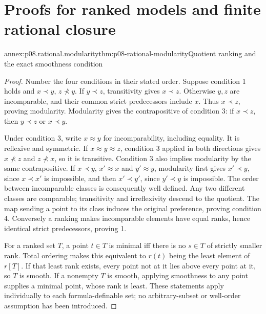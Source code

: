 \section{Proofs for ranked models and finite rational closure}
\label{annex:p08-ranked-models-rational-closure}

\begin{annexitem}{annex:p08.rational.modularity}{thm:p08-rational-modularity}{Quotient ranking and the exact smoothness condition}
\begin{proof}
Number the four conditions in their stated order. Suppose condition 1
holds and \(x\prec y\), \(z\not\prec y\). If \(y\prec z\),
transitivity gives \(x\prec z\). Otherwise \(y,z\) are
incomparable, and their common strict predecessors include \(x\).
Thus \(x\prec z\), proving modularity. Modularity gives the
contrapositive of condition 3: if \(x\prec z\), then
\(y\prec z\) or \(x\prec y\).

Under condition 3, write \(x\approx y\) for incomparability,
including equality. It is reflexive and symmetric. If
\(x\approx y\approx z\), condition 3 applied in both directions
gives \(x\not\prec z\) and \(z\not\prec x\), so it is
transitive. Condition 3 also implies modularity by the same
contrapositive. If \(x\prec y\), \(x'\approx x\) and
\(y'\approx y\), modularity first gives \(x'\prec y\), since
\(x\prec x'\) is impossible, and then \(x'\prec y'\), since
\(y'\prec y\) is impossible. The order between incomparable
classes is consequently well defined. Any two different classes are
comparable; transitivity and irreflexivity descend to the quotient.
The map sending a point to its class induces the original preference,
proving condition 4. Conversely a ranking makes incomparable elements
have equal ranks, hence identical strict predecessors, proving 1.

For a ranked set \(T\), a point \(t\in T\) is minimal iff
there is no \(s\in T\) of strictly smaller rank. Total ordering
makes this equivalent to \(r(t)\) being the least element of
\(r[T]\). If that least rank exists, every point not at it lies
above every point at it, so \(T\) is smooth. If a nonempty \(T\)
is smooth, applying smoothness to any point supplies a minimal point,
whose rank is least. These statements apply individually to each
formula-definable set; no arbitrary-subset or well-order assumption
has been introduced.
\end{proof}
\end{annexitem}

